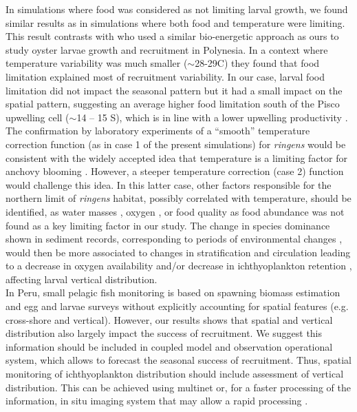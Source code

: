 In simulations where food was considered as not limiting larval growth, we found similar results as in simulations where both food and temperature were limiting. This result contrasts with \cite{ThomDuma2016} who used a similar bio-energetic approach as ours to study oyster larvae growth and recruitment in Polynesia. In a context where temperature variability was much smaller ($\sim$28-29\textdegree C) they found that food limitation explained most of recruitment variability. In our case, larval food limitation did not impact the seasonal pattern but it had a small impact on the spatial pattern, suggesting an average higher food limitation south of the Pisco upwelling cell ($\sim$14 – 15 \textdegree S), which is in line with a lower upwelling productivity \citep{EspiEche2017}.\\

The confirmation by laboratory experiments of a ``smooth” temperature correction function (as in case 1 of the present simulations) for \textit{\gls{ringens}} would be consistent with the widely accepted idea that temperature is a limiting factor for anchovy blooming \citep{ChavBert2008}. However, a steeper temperature correction (case 2) function would challenge this idea. In this latter case, other factors responsible for the northern limit of \textit{\gls{ringens}} habitat, possibly correlated with temperature, should be identified, as water masses \citep{BertSegu2004,SwarBert2008}, oxygen \citep{BertChai2011}, or food quality \citep{AyonSwar2008,CaldAyor2020} as food abundance was not found as a key limiting factor in our study. The change in species dominance shown in sediment records, corresponding to periods of environmental changes \citep{SalvField2018,SalvGuti2019}, would then be more associated to changes in stratification and circulation leading to a decrease in oxygen availability and/or decrease in ichthyoplankton retention \citep{BrocEche2013,EspiEche2021}, affecting larval vertical distribution.\\

In Peru, small pelagic fish monitoring is based on spawning biomass estimation and egg and larvae surveys \citep{PaulSori1987,Ayon2000,GutiCast2012} without explicitly accounting for spatial features (e.g. cross-shore and vertical). However, our results shows that spatial and vertical distribution also largely impact the success of recruitment. We suggest this information should be included in coupled model and observation operational system, which allows to forecast the seasonal success of recruitment. Thus, spatial monitoring of ichthyoplankton distribution should include assessment of vertical distribution. This can be achieved using multinet or, for a faster processing of the information, in situ imaging system that may allow a rapid processing \citep{OrenRate2020}.


